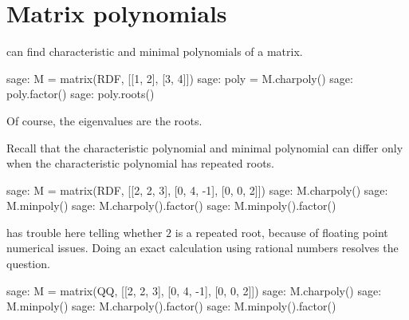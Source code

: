 





\section{Matrix polynomials}

\Sage{} can find characteristic and minimal polynomials of a matrix.
\begin{sagecommandline}
sage: M =  matrix(RDF, [[1, 2], [3, 4]]) 
sage: poly = M.charpoly()
sage: poly.factor()
sage: poly.roots()
\end{sagecommandline}
Of course, the eigenvalues are the roots.

Recall that the characteristic polynomial and minimal polynomial 
can differ only when 
the characteristic polynomial has repeated roots.
\begin{sagecommandline}
sage: M =  matrix(RDF, [[2, 2, 3], [0, 4, -1], [0, 0, 2]]) 
sage: M.charpoly()
sage: M.minpoly()
sage: M.charpoly().factor()
sage: M.minpoly().factor()
\end{sagecommandline}
\Sage{} has trouble here telling whether $2$ is a repeated 
root, because of floating point numerical issues.
Doing an exact calculation using 
rational numbers resolves the question.  
\begin{sagecommandline}
sage: M =  matrix(QQ, [[2, 2, 3], [0, 4, -1], [0, 0, 2]]) 
sage: M.charpoly()
sage: M.minpoly()
sage: M.charpoly().factor()
sage: M.minpoly().factor()
\end{sagecommandline}


